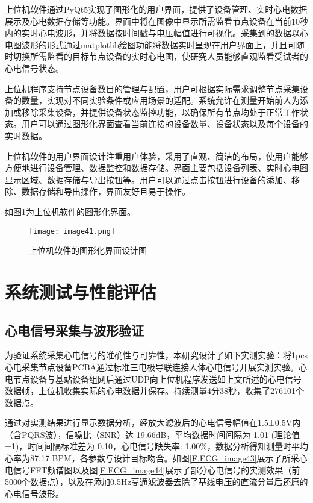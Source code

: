 上位机软件通过PyQt5实现了图形化的用户界面，提供了设备管理、实时心电数据展示及心电数据存储等功能。界面中将在图像中显示所需监看节点设备在当前10秒内的实时心电波形，并将数据按时间戳与电压幅值进行可视化。采集到的数据以心电图波形的形式通过matplotlib绘图功能将数据实时呈现在用户界面上，并且可随时切换所需监看的目标节点设备的实时心电图，使研究人员能够直观监看受试者的心电信号状态。

上位机程序支持节点设备数目的管理与配置，用户可根据实际需求调整节点采集设备的数量，实现对不同实验条件或应用场景的适配。系统允许在测量开始前人为添加或移除采集设备，并提供设备状态监控功能，以确保所有节点均处于正常工作状态。用户可以通过图形化界面查看当前连接的设备数量、设备状态以及每个设备的实时数据。

上位机软件的用户界面设计注重用户体验，采用了直观、简洁的布局，使用户能够方便地进行设备管理、数据监控和数据存储。界面主要包括设备列表、实时心电图显示区域、数据存储与导出按钮等。用户可以通过点击按钮进行设备的添加、移除、数据存储和导出操作，界面友好且易于操作。

如图\ref{F.ECG_image41}为上位机软件的图形化界面。

\begin{figure}[htb]
    \centering
    \texttt{[image: image41.png]}
    \caption{上位机软件的图形化界面设计图}
    \label{F.ECG_image41}
\end{figure}

\section{系统测试与性能评估}

\subsection{心电信号采集与波形验证}

为验证系统采集心电信号的准确性与可靠性，本研究设计了如下实测实验：将1pcs心电采集节点设备PCBA通过标准三电极导联连接人体心电信号开展实测实验。心电节点设备与基站设备组网后通过UDP向上位机程序发送如上文所述的心电信号数据帧，上位机收集实际的心电数据并保存。持续测量4分38秒，收集了276101个数据点。

通过对实测结果进行显示数据分析，经放大滤波后的心电信号幅值在1.5±0.5V内（含PQRS波），信噪比（SNR）达-19.66dB，平均数据时间间隔为 1.01 (理论值=1)，时间间隔标准差为 0.10，心电信号缺失率: 1.00\%，数据分析得知测量时平均心率为87.17 BPM，各参数与设计目标吻合。如图\ref{F.ECG_image43}展示了所采心电信号FFT频谱图以及图\ref{F.ECG_image44}展示了部分心电信号的实测效果（前5000个数据点），以及在添加0.5Hz高通滤波器去除了基线电压的直流分量后还原的心电信号波形。

